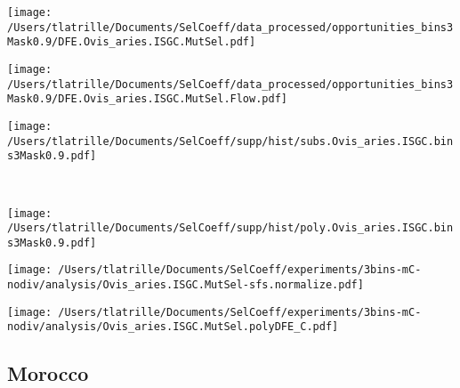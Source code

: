 \documentclass{article}
\begin{document}
    \begin{minipage}{0.32\linewidth}
        \texttt{[image: /Users/tlatrille/Documents/SelCoeff/data\_processed/opportunities\_bins3Mask0.9/DFE.Ovis\_aries.ISGC.MutSel.pdf]}
    \end{minipage}
    \begin{minipage}{0.32\linewidth}
        \texttt{[image: /Users/tlatrille/Documents/SelCoeff/data\_processed/opportunities\_bins3Mask0.9/DFE.Ovis\_aries.ISGC.MutSel.Flow.pdf]}
    \end{minipage}
    \begin{minipage}{0.32\linewidth}
        \texttt{[image: /Users/tlatrille/Documents/SelCoeff/supp/hist/subs.Ovis\_aries.ISGC.bins3Mask0.9.pdf]}
    \end{minipage}
    \\
    \begin{minipage}{0.32\linewidth}
        \texttt{[image: /Users/tlatrille/Documents/SelCoeff/supp/hist/poly.Ovis\_aries.ISGC.bins3Mask0.9.pdf]}
    \end{minipage}
    \begin{minipage}{0.32\linewidth}
        \texttt{[image: /Users/tlatrille/Documents/SelCoeff/experiments/3bins-mC-nodiv/analysis/Ovis\_aries.ISGC.MutSel-sfs.normalize.pdf]}
    \end{minipage}
    \begin{minipage}{0.32\linewidth}
        \texttt{[image: /Users/tlatrille/Documents/SelCoeff/experiments/3bins-mC-nodiv/analysis/Ovis\_aries.ISGC.MutSel.polyDFE\_C.pdf]}
    \end{minipage}
    \subsection{Morocco}
\end{document}
